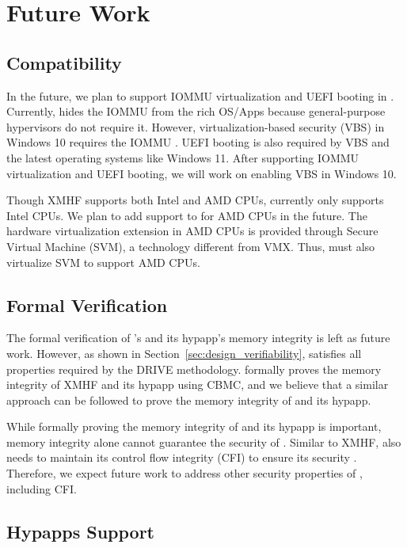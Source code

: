 \section{Future Work}

\subsection{Compatibility}

In the future, we plan to support IOMMU virtualization and UEFI booting in . Currently,  hides the IOMMU from the rich OS/Apps because general-purpose hypervisors do not require it. However, virtualization-based security (VBS) in Windows 10 requires the IOMMU \cite{windows_vbs}. UEFI booting is also required by VBS and the latest operating systems like Windows 11. After supporting IOMMU virtualization and UEFI booting, we will work on enabling VBS in Windows 10.

Though XMHF supports both Intel and AMD CPUs,  currently only supports Intel CPUs. We plan to add support to  for AMD CPUs in the future. The hardware virtualization extension in AMD CPUs is provided through Secure Virtual Machine (SVM), a technology different from VMX. Thus,  must also virtualize SVM to support AMD CPUs.

\subsection{Formal Verification}

The formal verification of 's and its hypapp's memory integrity is left as future work. However, as shown in Section~\ref{sec:design_verifiability},  satisfies all properties required by the \textsc{DRIVE} methodology. \cite{vasudevan2013design} formally proves the memory integrity of XMHF and its hypapp using CBMC, and we believe that a similar approach can be followed to prove the memory integrity of  and its hypapp.

While formally proving the memory integrity of  and its hypapp is important, memory integrity alone cannot guarantee the security of . Similar to XMHF,  also needs to maintain its control flow integrity (CFI) to ensure its security \cite{vasudevan2013design}. Therefore, we expect future work to address other security properties of , including CFI.

\subsection{Hypapps Support}

